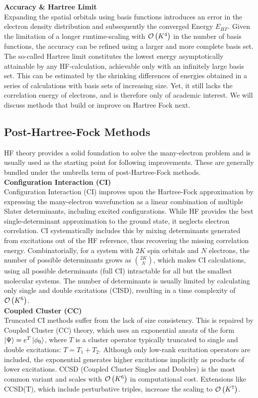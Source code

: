 \textbf{Accuracy \& Hartree Limit}\\
Expanding the spatial orbitals using basis functions introduces an error in the electron density distribution and subsequently the converged Energy $E_{HF}$. Given the limitation of a longer runtime-scaling with $\mathcal{O}\left(K^4\right)$ in the number of basis functions, the accuracy can be refined using a larger and more complete basis set. The so-called Hartree limit constitutes the lowest energy asymptotically attainable by any HF-calculation, achievable only with an infinitely large basis set. This can be estimated by the shrinking differences of energies obtained in a series of calculations with basis sets of increasing size. \parencite{ref:Jensen2005hf} Yet, it still lacks the correlation energy of electrons, and is therefore only of academic interest. We will discuss methods that build or improve on Hartree Fock next. 

\subsection{Post-Hartree-Fock Methods}
\label{subsec:background_post_hf}
HF theory provides a solid foundation to solve the many-electron problem and is usually used as the starting point for following improvements. These are generally bundled under the umbrella term of post-Hartree-Fock methods.\\

\textbf{Configuration Interaction (CI)}\\
Configuration Interaction (CI) improves upon the Hartree-Fock approximation by expressing the many-electron wavefunction as a linear combination of multiple Slater determinants, including excited configurations. While HF provides the best single-determinant approximation to the ground state, it neglects electron correlation. CI systematically includes this by mixing determinants generated from excitations out of the HF reference, thus recovering the missing correlation energy. Combinatorially, for a system with $2K$ spin orbitals and $N$ electrons, the number of possible determinants grows as $\binom{2K}{N}$, which makes CI calculations, using all possible determinants (full CI) intractable for all but the smallest molecular systems. The number of determinants is usually limited by calculating only single and double excitations (CISD), resulting in a time complexity of $\mathcal{O}\left(K^6\right)$.\\

\textbf{Coupled Cluster (CC)}\\
Truncated CI methods suffer from the lack of size consistency. This is repaired by Coupled Cluster (CC) theory, which uses an exponential ansatz of the form $\ket{\Psi} = e^T \ket{\phi_0}$, where $T$ is a cluster operator typically truncated to single and double excitations: $T = T_1 + T_2$. Although only low-rank excitation operators are included, the exponential generates higher excitations implicitly as products of lower excitations. CCSD (Coupled Cluster Singles and Doubles) is the most common variant and scales with $\mathcal{O}\left(K^6\right)$ in computational cost. Extensions like CCSD(T), which include perturbative triples, increase the scaling to $\mathcal{O}\left(K^7\right)$.

